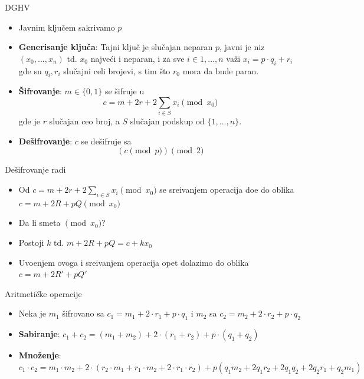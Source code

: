 \documentclass[aspectratio=1610]{beamer}
\begin{document}
\begin{frame}{DGHV}
\begin{itemize}
    \item Javnim klju\v cem sakrivamo $p$
    \item \textbf{Generisanje ključa}: Tajni ključ je slučajan neparan $p$, javni je niz $(x_0, ..., x_n)$ td. $x_0$ najve\' ci i neparan, i za sve $i\in {1, ..., n}$ va\v zi $x_i = p\cdot q_i + r_i $ gde su 
$q_i, r_i$ slu\v cajni celi brojevi, s tim \v sto $r_0$ mora da bude paran.
    \item \textbf{\v Sifrovanje}: $m \in \{0, 1\}$ se \v sifruje u \[c = m + 2r + 2\sum_{i\in S}x_i \pmod{x_0}\] gde je $r$ slu\v cajan ceo broj, a  $S$ slu\v cajan podskup od $\{1, ..., n\}$.
    \item \textbf{De\v sifrovanje}: $c$ se de\v sifruje sa \[(c \pmod{p}) \pmod{2}\]
\end{itemize}
\end{frame}

\begin{frame}{De\v sifrovanje radi}
\begin{itemize}
    \item Od $c = m + 2r + 2\sum_{i\in S}x_i \pmod{x_0}$ se sre\dj ivanjem operacija do\dj e do oblika $c = m + 2R + pQ \pmod{x_0}$
    \item Da li smeta $\pmod{x_0}$?
    \item Postoji $k$ td. $m + 2R + pQ = c + kx_0$
    \item Uvo\dj enjem ovoga i sre\dj ivanjem operacija opet dolazimo do oblika $c = m + 2R' + pQ'$
\end{itemize}
\end{frame}

\begin{frame}{Aritmeti\v cke operacije}
\begin{itemize}
    \item Neka je $m_1$ \v sifrovano sa $c_1=m_1 + 2\cdot r_1 + p\cdot q_1$ i $m_2$ sa $c_2=m_2 + 2\cdot r_2 + p\cdot q_2$
    \item \textbf{Sabiranje}: $c_1 + c_2 = (m_1 + m_2) + 2\cdot (r_1 + r_2) + p\cdot (q_1 + q_2)$
    \item \textbf{Mno\v zenje}: $c_1\cdot c_2 = m_1\cdot m_2 + 2\cdot (r_2\cdot m_1 + r_1\cdot m_2 + 2\cdot r_1\cdot r_2) + p(q_1m_2 + 2q_1r_2 + 2q_1q_2 + 2q_2r_1 + q_2m_1)$
\end{itemize}
\end{frame}
\end{document}
